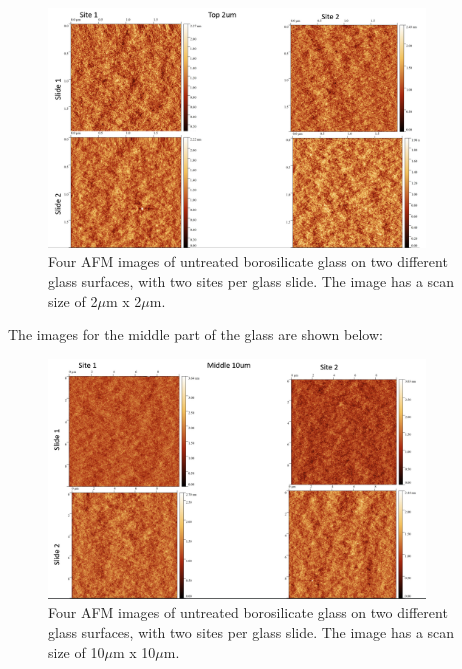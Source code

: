 \begin{figure}[h!!!!]     %
        \begin{center}
          \includegraphics[width=100mm]{chapter3/Top 2um.png}
\end{center}
\caption{Four AFM images of untreated borosilicate glass on two different glass surfaces, with two sites per glass slide. The image has a scan size of 2$\mu$m x 2$\mu$m.}
\label{fig:figure9}                 %
\end{figure}   

\newpage
The images for the middle part of the glass are shown below:

\begin{figure}[h!!!!]     %
        \begin{center}
          \includegraphics[width=100mm]{chapter3/mid 10um.png}
\end{center}
\caption{Four AFM images of untreated borosilicate glass on two different glass surfaces, with two sites per glass slide. The image has a scan size of 10$\mu$m x 10$\mu$m.}
\label{fig:figure9}                 %
\end{figure}   

